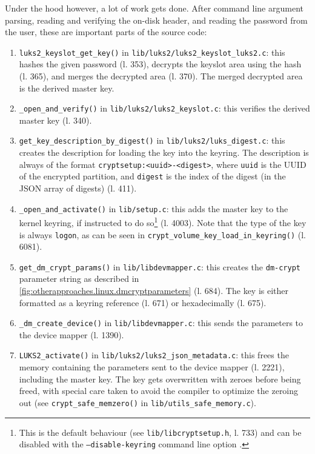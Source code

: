 Under the hood however, a lot of work gets done. After command line argument parsing, reading and verifying the on-disk header, and reading the password from the user, these are important parts of the source code:
\begin{enumerate}
	\item \texttt{luks2\_keyslot\_get\_key()} in \texttt{lib/luks2/luks2\_keyslot\_luks2.c}: this hashes the given password (l. 353), decrypts the keyslot area using the hash (l. 365), and merges the decrypted area (l. 370). The merged decrypted area is the derived master key.
	\item \texttt{\_open\_and\_verify()} in \texttt{lib/luks2/luks2\_keyslot.c}: this verifies the derived master key (l. 340).
	\item \texttt{get\_key\_description\_by\_digest()} in \texttt{lib/luks2/luks\_digest.c}: this creates the description for loading the key into the keyring. The description is always of the format \texttt{cryptsetup:<uuid>-<digest>}, where \texttt{uuid} is the UUID of the encrypted partition, and \texttt{digest} is the index of the digest (in the JSON array of digests) (l. 411).
	\item \texttt{\_open\_and\_activate()} in \texttt{lib/setup.c}: this adds the master key to the kernel keyring, if instructed to do so\footnote{\label{fn:otherapproaches.linux.keyring} This is the default behaviour (see \texttt{lib/libcryptsetup.h}, l. 733) and can be disabled with the \texttt{---disable-keyring} command line option \cite{ManCryptsetup}.} (l. 4003). Note that the type of the key is always \texttt{logon}, as can be seen in \texttt{crypt\_volume\_key\_load\_in\_keyring()} (l. 6081).
	\item \texttt{get\_dm\_crypt\_params()} in \texttt{lib/libdevmapper.c}: this creates the \texttt{dm-crypt} parameter string as described in \autoref{fig:otherapproaches.linux.dmcryptparameters} (l. 684). The key is either formatted as a keyring reference (l. 671) or hexadecimally (l. 675).
	\item \texttt{\_dm\_create\_device()} in \texttt{lib/libdevmapper.c}: this sends the parameters to the device mapper (l. 1390).
	\item \texttt{LUKS2\_activate()} in \texttt{lib/luks2/luks2\_json\_metadata.c}: this frees the memory containing the parameters sent to the device mapper (l. 2221), including the master key. The key gets overwritten with zeroes before being freed, with special care taken to avoid the compiler to optimize the zeroing out (see \texttt{crypt\_safe\_memzero()} in \texttt{lib/utils\_safe\_memory.c}).
\end{enumerate}

